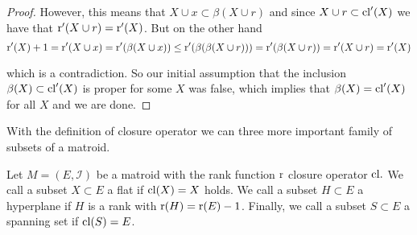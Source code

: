 \begin{proof}
However, this means that $X \cup x \subset \beta(X\cup r)$ and since $X\cup r \subset \mathrm{cl}'(X)$ we have that $\text{r}'(X\cup r) = 
\text{r}'(X)$. But on the other hand $$\text{r}'(X) + 1= \text{r}'(X\cup x) = \text{r}'(\beta(X\cup x))\leq \text{r}'(\beta(\beta(X\cup r))) = \text{r}'(\beta(X\cup r)) = \text{r}'(X\cup r) = \text{r}'(X)$$

which is a contradiction. So our initial assumption that the inclusion $\beta(X) \subset \mathrm{cl}'(X)$ is proper for some $X$ was false, which implies that $\beta(X) = \mathrm{cl}'(X)$ for all $X$ and we are done.




\end{proof}


With the definition of closure operator we can three more important family of subsets of a matroid.

\begin{defn}
    Let $M = (E, \mathcal{I})$ be a matroid with the rank function $\text{r}$ closure operator $\mathrm{cl}.$ We call a subset $X \subset E$ a flat if $\mathrm{cl}(X) = X$ holds. We call a subset $H \subset E$ a hyperplane if $H$ is a rank with $\text{r}(H) = \text{r}(E)-1$. Finally, we call a subset $S \subset E$ a spanning set if $\mathrm{cl}(S) = E$.
\end{defn}


